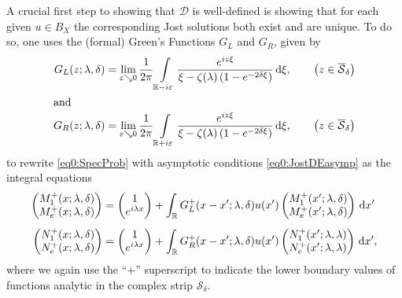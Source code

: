\documentclass[../dissertation.tex]{subfiles}
\begin{document}
A crucial first step to showing that $\mathscr D$ is well-defined is showing that 
for each given $u \in B_X$ the corresponding Jost solutions both exist and are 
unique. To do so, one uses 
the (formal) Green's Functions $G_L$ and $G_R$, given by 
\begin{subequations}
	\label{eq0:GFs}
	\begin{align}
		\label{eq0:GFL}
		G_L(z; \lambda, \delta) 
			&= 
				\lim_{\varepsilon \searrow 0} 
				\frac{1}{2\pi} 
				\int\limits_{\mathbb R - i\varepsilon} 
					\frac{e^{iz\xi}}
						{\xi -  \zeta(\lambda) \left(1- e^{-2 \delta \xi}\right) } 
				\, \mathrm{d}\xi, 
				\qquad \left(z\in \overline{\mathcal{S}}_\delta \right)\\
		\intertext{and}
		\label{eq0:GFR}
		G_R(z; \lambda, \delta) 
			&= 
				\lim_{\varepsilon \searrow 0} 
				\frac{1}{2\pi} 
				\int\limits_{\mathbb R + i\varepsilon} 
					\frac{e^{iz\xi}}
						{\xi -  \zeta(\lambda) \left(1- e^{-2 \delta \xi}\right) } 
				\, \mathrm{d}\xi,
				\qquad \left(z\in \overline{\mathcal{S}}_\delta \right)
	\end{align}
\end{subequations}
to rewrite \eqref{eq0:SpecProb} with asymptotic conditions \eqref{eq0:JostDEasymp} 
as the integral equations
\begin{subequations}
	\label{eq0:JostIE}
	\begin{align}
		\label{eq0:JostIEleft}
		\begin{pmatrix}
			M_1^+(x; \lambda, \delta) \\
			M_e^+(x; \lambda, \delta)
		\end{pmatrix}
			&= 
				\begin{pmatrix}
					1 \\
					e^{i\lambda x} 
				\end{pmatrix}
				+ \int_{\mathbb R} G_L^+(x - x'; \lambda, \delta) 
					u(x')
					\begin{pmatrix}
						M_1^+(x'; \lambda, \delta) \\
						M_e^+(x'; \lambda, \delta) 
					\end{pmatrix}
					\, \mathrm{d}x' \\[0.3\baselineskip]
		\label{eq0:JostIEright}
		\begin{pmatrix}
			N_1^+(x; \lambda, \delta) \\
			N_e^+(x; \lambda, \delta)
		\end{pmatrix}
			&= 
				\begin{pmatrix}
					1 \\
					e^{i\lambda x} 
				\end{pmatrix}
				+ \int_{\mathbb R} G_R^+(x - x'; \lambda, \delta) 
					u(x')
					\begin{pmatrix}
						N_1^+(x'; \lambda, \lambda) \\
						N_e^+(x'; \lambda, \lambda) 
					\end{pmatrix}
					\, \mathrm{d}x',
	\end{align}
\end{subequations}
where we again use the ``$+$'' superscript to indicate the lower boundary
values of functions analytic in the complex strip $\mathcal S_\delta$.
\end{document}
